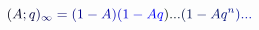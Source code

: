 \documentclass[12pt]{article}
\begin{document}
\makeatletter
\renewcommand*{\@textcolor}[3]{%
  \protect\leavevmode
  \begingroup
    \color#1{#2}#3%
  \endgroup
}
\makeatother
\begin{displaymath}
\mathcolor[RGB]{0,0,15}{(} \mathcolor[RGB]{0,0,30}{A} \mathcolor[RGB]{0,0,45}{;} \mathcolor[RGB]{0,0,60}{q} \mathcolor[RGB]{0,0,75}{)} _ { \mathcolor[RGB]{0,0,90}{\infty} } \mathcolor[RGB]{0,0,105}{=} \mathcolor[RGB]{0,0,120}{(} \mathcolor[RGB]{0,0,135}{1} \mathcolor[RGB]{0,0,150}{-} \mathcolor[RGB]{0,0,165}{A} \mathcolor[RGB]{0,0,180}{)} \mathcolor[RGB]{0,0,195}{(} \mathcolor[RGB]{0,0,210}{1} \mathcolor[RGB]{0,0,225}{-} \mathcolor[RGB]{0,0,240}{A} \mathcolor[RGB]{0,0,255}{q} \mathcolor[RGB]{0,15,0}{)} \mathcolor[RGB]{0,15,15}{.} \mathcolor[RGB]{0,15,30}{.} \mathcolor[RGB]{0,15,45}{.} \mathcolor[RGB]{0,15,60}{(} \mathcolor[RGB]{0,15,75}{1} \mathcolor[RGB]{0,15,90}{-} \mathcolor[RGB]{0,15,105}{A} \mathcolor[RGB]{0,15,120}{q} ^ { \mathcolor[RGB]{0,15,135}{n} } \mathcolor[RGB]{0,15,150}{)} \mathcolor[RGB]{0,15,165}{.} \mathcolor[RGB]{0,15,180}{.} \mathcolor[RGB]{0,15,195}{.}
\end{displaymath}
\end{document}
